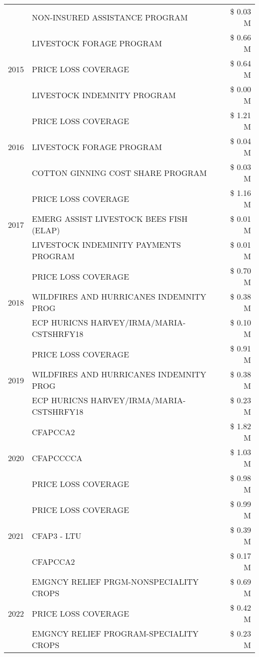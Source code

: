 \begin{tabular}{llr}
 & NON-INSURED ASSISTANCE PROGRAM & \$ 0.03 M \\
\cline{1-3}
\multirow[t]{3}{*}{2015} & LIVESTOCK FORAGE PROGRAM & \$ 0.66 M \\
 & PRICE LOSS COVERAGE & \$ 0.64 M \\
 & LIVESTOCK INDEMNITY PROGRAM & \$ 0.00 M \\
\cline{1-3}
\multirow[t]{3}{*}{2016} & PRICE LOSS COVERAGE & \$ 1.21 M \\
 & LIVESTOCK FORAGE PROGRAM & \$ 0.04 M \\
 & COTTON GINNING COST SHARE PROGRAM & \$ 0.03 M \\
\cline{1-3}
\multirow[t]{3}{*}{2017} & PRICE LOSS COVERAGE & \$ 1.16 M \\
 & EMERG ASSIST LIVESTOCK BEES FISH (ELAP) & \$ 0.01 M \\
 & LIVESTOCK INDEMINITY PAYMENTS PROGRAM & \$ 0.01 M \\
\cline{1-3}
\multirow[t]{3}{*}{2018} & PRICE LOSS COVERAGE & \$ 0.70 M \\
 & WILDFIRES AND HURRICANES INDEMNITY PROG & \$ 0.38 M \\
 & ECP HURICNS HARVEY/IRMA/MARIA-CSTSHRFY18 & \$ 0.10 M \\
\cline{1-3}
\multirow[t]{3}{*}{2019} & PRICE LOSS COVERAGE & \$ 0.91 M \\
 & WILDFIRES AND HURRICANES INDEMNITY PROG & \$ 0.38 M \\
 & ECP HURICNS HARVEY/IRMA/MARIA-CSTSHRFY18 & \$ 0.23 M \\
\cline{1-3}
\multirow[t]{3}{*}{2020} & CFAPCCA2 & \$ 1.82 M \\
 & CFAPCCCCA & \$ 1.03 M \\
 & PRICE LOSS COVERAGE & \$ 0.98 M \\
\cline{1-3}
\multirow[t]{3}{*}{2021} & PRICE LOSS COVERAGE & \$ 0.99 M \\
 & CFAP3 - LTU & \$ 0.39 M \\
 & CFAPCCA2 & \$ 0.17 M \\
\cline{1-3}
\multirow[t]{3}{*}{2022} & EMGNCY RELIEF PRGM-NONSPECIALITY CROPS & \$ 0.69 M \\
 & PRICE LOSS COVERAGE & \$ 0.42 M \\
 & EMGNCY RELIEF PROGRAM-SPECIALITY CROPS & \$ 0.23 M \\
\cline{1-3}
\bottomrule
\end{tabular}
